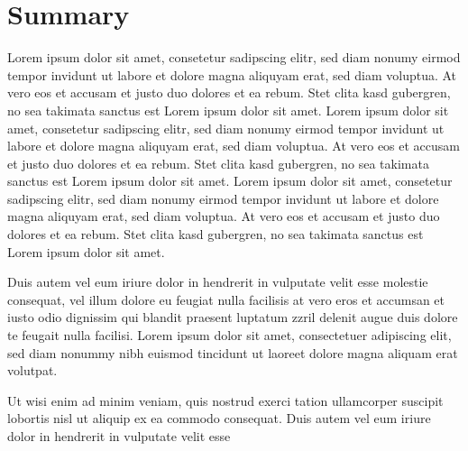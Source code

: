 \section{Summary}
\label{sec:eval:Summary}

Lorem ipsum dolor sit amet, consetetur sadipscing elitr, sed diam nonumy eirmod tempor invidunt ut labore et dolore magna aliquyam erat, sed diam voluptua. At vero eos et accusam et justo duo dolores et ea rebum. Stet clita kasd gubergren, no sea takimata sanctus est Lorem ipsum dolor sit amet. Lorem ipsum dolor sit amet, consetetur sadipscing elitr, sed diam nonumy eirmod tempor invidunt ut labore et dolore magna aliquyam erat, sed diam voluptua. At vero eos et accusam et justo duo dolores et ea rebum. Stet clita kasd gubergren, no sea takimata sanctus est Lorem ipsum dolor sit amet. Lorem ipsum dolor sit amet, consetetur sadipscing elitr, sed diam nonumy eirmod tempor invidunt ut labore et dolore magna aliquyam erat, sed diam voluptua. At vero eos et accusam et justo duo dolores et ea rebum. Stet clita kasd gubergren, no sea takimata sanctus est Lorem ipsum dolor sit amet.   

Duis autem vel eum iriure dolor in hendrerit in vulputate velit esse molestie consequat, vel illum dolore eu feugiat nulla facilisis at vero eros et accumsan et iusto odio dignissim qui blandit praesent luptatum zzril delenit augue duis dolore te feugait nulla facilisi. Lorem ipsum dolor sit amet, consectetuer adipiscing elit, sed diam nonummy nibh euismod tincidunt ut laoreet dolore magna aliquam erat volutpat.   

Ut wisi enim ad minim veniam, quis nostrud exerci tation ullamcorper suscipit lobortis nisl ut aliquip ex ea commodo consequat. Duis autem vel eum iriure dolor in hendrerit in vulputate velit esse

